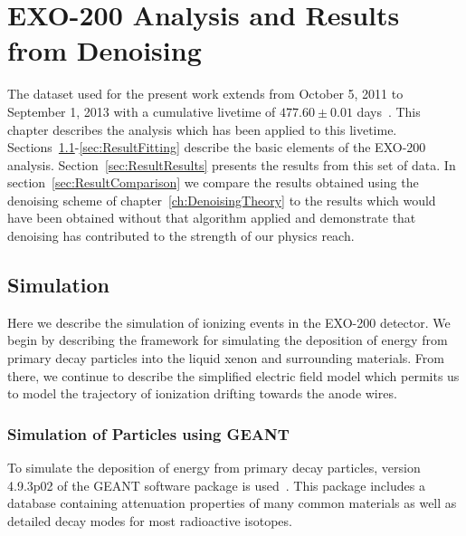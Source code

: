 \renewcommand{\thechapter}{7}
\chapter{EXO-200 Analysis and Results from Denoising}
\label{ch:DenoisingResults}

The dataset used for the present work extends from October 5, 2011 to September 1, 2013 with a cumulative livetime of $477.60 \pm 0.01$ days~\cite{NewEXObb0nPaper_2014}.  This chapter describes the analysis which has been applied to this livetime.  Sections~\ref{sec:ResultSimulation}-\ref{sec:ResultFitting} describe the basic elements of the EXO-200 analysis.  Section~\ref{sec:ResultResults} presents the results from this set of data.  In section~\ref{sec:ResultComparison} we compare the results obtained using the denoising scheme of chapter~\ref{ch:DenoisingTheory} to the results which would have been obtained without that algorithm applied and demonstrate that denoising has contributed to the strength of our physics reach.

\section{Simulation}\label{sec:ResultSimulation}

Here we describe the simulation of ionizing events in the EXO-200 detector.  We begin by describing the framework for simulating the deposition of energy from primary decay particles into the liquid xenon and surrounding materials.  From there, we continue to describe the simplified electric field model which permits us to model the trajectory of ionization drifting towards the anode wires.

\subsection{Simulation of Particles using GEANT}

To simulate the deposition of energy from primary decay particles, version 4.9.3p02 of the GEANT software package is used~\cite{Agostinelli2003250,1610988}.  This package includes a database containing attenuation properties of many common materials as well as detailed decay modes for most radioactive isotopes.

